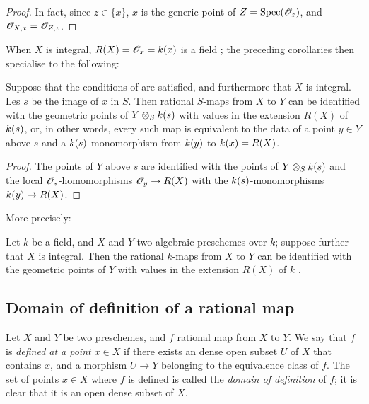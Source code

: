 \begin{proof}
\label{proof-1.7.1.14}
In fact, since $z\in\overline{\{x\}}$, $x$ is the generic point of $Z={\mathop{\mathrm{Spec}}\nolimits}(\mathscr{O}_z)$, and $\mathscr{O}_{X,x}=\mathscr{O}_{Z,z}$.
\end{proof}

When $X$ is integral, $R(X)=\mathscr{O}_x=k(x)$ is a field ; the preceding corollaries then specialise to the following:

\begin{cor}[7.1.15]
\label{1.7.1.15}
Suppose that the conditions of  are satisfied, and furthermore that $X$ is integral.
Les $s$ be the image of $x$ in $S$.
Then rational $S$-maps from $X$ to $Y$ can be identified with the geometric points of $Y\otimes_Sk(s)$ with values in the extension $R(X)$ of $k(s)$, or, in other words, every such map is equivalent to the data of a point $y\in Y$ above $s$ and a $k(s)$-monomorphism from $k(y)$ to $k(x)=R(X)$.
\end{cor}

\begin{proof}
\label{proof-1.7.1.15}
The points of $Y$ above $s$ are identified with the points of $Y\otimes_Sk(s)$  and the local $\mathscr{O}_s$-homomorphisms $\mathscr{O}_y\to R(X)$ with the $k(s)$-monomorphisms $k(y)\to R(X)$.
\end{proof}

More precisely:
\begin{cor}[7.1.16]
\label{1.7.1.16}
Let $k$ be a field, and $X$ and $Y$ two algebraic preschemes  over $k$; suppose further that $X$ is integral.
Then the rational $k$-maps from $X$ to $Y$ can be identified with the geometric points of $Y$ with values in the extension $R(X)$ of $k$ .
\end{cor}

\subsection{Domain of definition of a rational map}
\label{subsection-domain-of-definition-of-a-rational-map}

\begin{env}[7.2.1]
\label{1.7.2.1}
Let $X$ and $Y$ be two preschemes, and $f$ rational map from $X$ to $Y$.
We say that $f$ is \emph{defined at a point $x\in X$} if there exists an dense open subset $U$ of $X$ that contains $x$, and a morphism $U\to Y$ belonging to the equivalence class of $f$.
The set of points $x\in X$ where $f$ is defined is called the \emph{domain of definition} of $f$; it is clear that it is an open dense subset of $X$.
\end{env}

